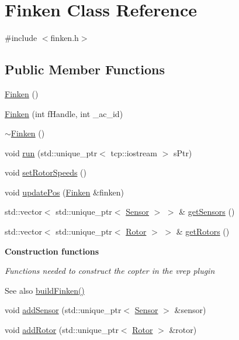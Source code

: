 \hypertarget{classFinken}{}\section{Finken Class Reference}
\label{classFinken}


{\ttfamily \#include $<$finken.\+h$>$}

\subsection*{Public Member Functions}
\begin{DoxyCompactItemize}
\item 
\hyperlink{classFinken_afb256567ee9aa96c409fdb0529b4f228}{Finken} ()
\item 
\hyperlink{classFinken_a3f27a92dd8f76167a9766323267d5b46}{Finken} (int f\+Handle, int \+\_\+ac\+\_\+id)
\item 
\hyperlink{classFinken_a94e6a3b5b14ec7ee351d219eb17be45b}{$\sim$\+Finken} ()
\item 
void \hyperlink{classFinken_ae3c3abbf571407e210f4b03b68cada9d}{run} (std\+::unique\+\_\+ptr$<$ tcp\+::iostream $>$ s\+Ptr)
\item 
void \hyperlink{classFinken_aaead1098c0752c8ec5b99bccd9945f3b}{set\+Rotor\+Speeds} ()
\item 
void \hyperlink{classFinken_afddc56af42f000ff17c4a00779b4ad6a}{update\+Pos} (\hyperlink{classFinken}{Finken} \&finken)
\item 
std\+::vector$<$ std\+::unique\+\_\+ptr$<$ \hyperlink{classSensor}{Sensor} $>$ $>$ \& \hyperlink{classFinken_a1215883fb6df7c4853e498dec43b4e6a}{get\+Sensors} ()
\item 
std\+::vector$<$ std\+::unique\+\_\+ptr$<$ \hyperlink{classRotor}{Rotor} $>$ $>$ \& \hyperlink{classFinken_a610ce496f1c5f2ca22850ee26c54510c}{get\+Rotors} ()
\end{DoxyCompactItemize}
\begin{Indent}{\bf Construction functions}\par
{\em Functions needed to construct the copter in the vrep plugin \begin{DoxySeeAlso}{See also}
\hyperlink{finken_8h_a5810da3d23510cfe71d23902cddb8b51}{build\+Finken()} 
\end{DoxySeeAlso}
}\begin{DoxyCompactItemize}
\item 
void \hyperlink{classFinken_a2f2adb211e80a689f580b87730aeb9d1}{add\+Sensor} (std\+::unique\+\_\+ptr$<$ \hyperlink{classSensor}{Sensor} $>$ \&sensor)
\item 
void \hyperlink{classFinken_a4ac9d9b37fba41147a83a36286fbe91b}{add\+Rotor} (std\+::unique\+\_\+ptr$<$ \hyperlink{classRotor}{Rotor} $>$ \&rotor)
\end{DoxyCompactItemize}
\end{Indent}
